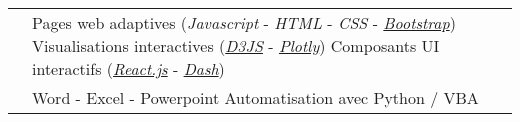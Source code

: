 \documentclass[a4paper]{cv}
\begin{document}
\begin{minipage}[t]{0.6\textwidth}
\begin{tabular}{R{0.21\textwidth} L{0.7\textwidth}}
 & Pages web adaptives (\emph{Javascript} - \emph{HTML} - \emph{CSS} - \href{http://getbootstrap.com/}{\emph{Bootstrap}}) \tbl{} Visualisations interactives (\href{https://d3js.org}{\emph{D3JS}} - \href{https://plot.ly/}{\emph{Plotly}}) \tbl{} Composants UI interactifs (\href{https://reactjs.org}{\emph{React.js}} - \href{https://dash.plot.ly/}{\emph{Dash}}) \\

 & Word - Excel - Powerpoint \tbl{} Automatisation avec Python / VBA\\

\end{tabular}

\vspace{5pt}

\end{minipage}
\hsepcol
\end{document}
